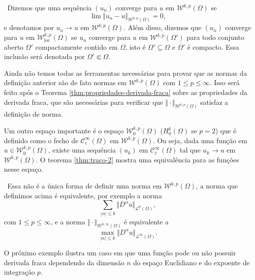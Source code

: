 \documentclass[a4paper, 11pt]{book}
\theoremstyle{definition}
\newcommand{\obs}{\noindent{\textbf{\textcolor{black}{\sffamily Observação:}}}~}
\newcommand{\cC}{\mathcal{C}}
\newcommand{\cL}{\mathcal{L}}
\newcommand{\cW}{\mathcal{W}}
\newcommand{\loc}{\mathrm{loc}}
\begin{document}
\obs Dizemos que uma sequência $(u_n)$ converge para $u$ em $\cW^{k,p}(\Omega)$ se
\[
    \lim \Vert u_n - u \Vert_{\cW^{k,p}(\Omega)} = 0,
\]
e denotamos por $u_n \to u \text{ em } \cW^{k,p}(\Omega)$.
Além disso, dizemos que $(u_n)$ converge para $u$ em $\cW^{k,p}_\loc(\Omega)$ se $u_n$ converge para $u$ em $\cW^{k,p}(\Omega')$ para todo conjunto aberto $\Omega'$ compactamente contido em $\Omega$, isto é $\Omega' \subseteq \Omega$ e $\overline{\Omega'}$ é compacto. Essa inclusão será denotada por $\Omega' \Subset \Omega$.

Ainda não temos todas as ferramentas necessárias para provar que as normas da definição anterior são de fato normas em $\cW^{k,p}(\Omega)$ com $1 \leqslant p \leqslant \infty$. Isso será feito após o Teorema \ref{thm:propriedades-derivada-fraca} sobre as propriedades da derivada fraca, que são necessárias para verificar que $\Vert \cdot \Vert_{\cW^{k,p}(\Omega)}$ satisfaz a definição de norma.

Um outro espaço importante é o espaço $\cW^{k,p}_0(\Omega)$ ($H^k_0(\Omega)$ se $p = 2$) que é definido como o fecho de $\cC^{\infty}_c(\Omega)$ em $\cW^{k,p}(\Omega)$. Ou seja, dada uma função em $u \in \cW^{k,p}_0(\Omega)$, existe uma sequência $(u_k)$ em $\cC^{\infty}_c(\Omega)$ tal que $u_k \to u$ em $\cW^{k,p}(\Omega)$.
O teorema \ref{thm:traco-2} mostra uma equivalência para as funções nesse espaço.

\obs Essa não é a única forma de definir uma norma em $\cW^{k,p}(\Omega)$, a norma que definimos acima é equivalente, por exemplo a norma
\[
    \sum_{|\alpha| \leqslant k} \Vert D^\alpha u \Vert_{\cL^p(\Omega)},
\]
com $1 \leqslant p \leqslant \infty$, e a norma $\Vert \cdot \Vert_{\cW^{k,\infty}(\Omega)}$ é equivalente a
\[
    \max_{|\alpha|\leqslant k} \Vert D^\alpha u \Vert_{\cL^\infty(\Omega)}.
\]

O próximo exemplo ilustra um caso em que uma função pode ou não possuir derivada fraca dependendo da dimensão $n$ do espaço Euclidiano e do expoente de integração $p$.
\end{document}
